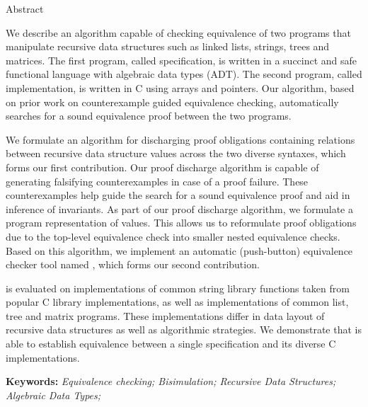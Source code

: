 \begin{center}

\LARGE{Abstract}
\end{center}
We describe an algorithm capable of checking
equivalence of two programs that manipulate recursive
data structures such as linked lists, strings, trees
and matrices. The first program, called specification,
is written in a succinct and safe functional language
with algebraic data types (ADT).
The second program, called implementation,
is written in C using arrays and pointers.
Our algorithm, based on prior work on
counterexample guided equivalence checking,
automatically searches for a sound equivalence proof
between the two programs.

\noindent We formulate an algorithm for discharging
proof obligations containing relations
between recursive data structure values across
the two diverse syntaxes, which forms our first contribution.
Our proof discharge algorithm is capable
of generating falsifying counterexamples in case of
a proof failure.
These counterexamples help guide the search for a sound equivalence proof
and aid in inference of invariants.
As part of our proof discharge algorithm,
we formulate a program representation of values.
This allows us to reformulate proof obligations
due to the top-level equivalence check
into smaller nested equivalence checks.
Based on this algorithm,
we implement an automatic (push-button) equivalence checker tool named \toolName{},
which forms our second contribution.

\noindent \toolName{} is evaluated on
implementations of common string library
functions taken from popular C library implementations,
as well as
implementations of common list, tree and matrix programs.
These implementations differ in data layout
of recursive data structures as well as
algorithmic strategies.
We demonstrate that \toolName{} is able to establish equivalence
between a single specification and its diverse C implementations.


\textbf{Keywords:} \textit{Equivalence checking; Bisimulation; Recursive Data Structures; Algebraic Data Types;}

\setlength{\parindent}{1.0em}
